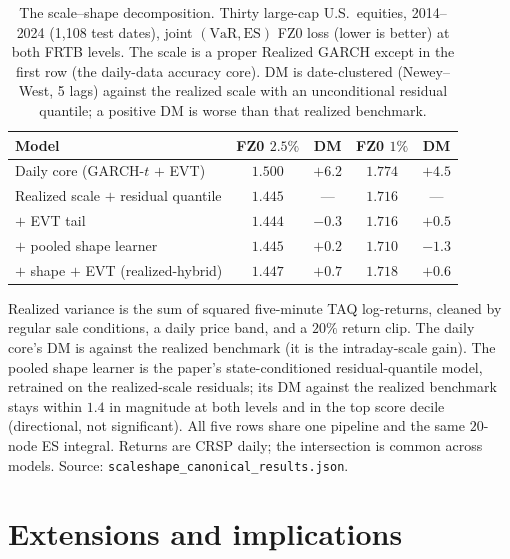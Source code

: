 \documentclass[11pt]{article}
\newcommand{\VaR}{\mathrm{VaR}}
\newcommand{\ES}{\mathrm{ES}}
\theoremstyle{remark}
\begin{document}
\begin{table}[t]
\centering
\begin{threeparttable}
\caption{The scale--shape decomposition. Thirty large-cap U.S.\ equities,
2014--2024 (1{,}108 test dates), joint $(\VaR,\ES)$ FZ0 loss (lower is better) at
both FRTB levels. The scale is a proper Realized GARCH except in the first row (the
daily-data accuracy core). DM is date-clustered (Newey--West, 5 lags) against the
realized scale with an unconditional residual quantile; a positive DM is worse than
that realized benchmark.}
\label{tab:rgarch}
\small\setlength{\tabcolsep}{6pt}
\begin{tabular}{lcccc}
\toprule
Model & FZ0 $2.5\%$ & DM & FZ0 $1\%$ & DM \\
\midrule
Daily core (GARCH-$t$ $+$ EVT) & $1.500$ & $+6.2$ & $1.774$ & $+4.5$ \\
Realized scale $+$ residual quantile & $1.445$ & --- & $1.716$ & --- \\
\quad $+$ EVT tail & $1.444$ & $-0.3$ & $1.716$ & $+0.5$ \\
\quad $+$ pooled shape learner & $1.445$ & $+0.2$ & $1.710$ & $-1.3$ \\
\quad $+$ shape $+$ EVT (realized-hybrid) & $1.447$ & $+0.7$ & $1.718$ & $+0.6$ \\
\bottomrule
\end{tabular}
\begin{tablenotes}\footnotesize
\item Realized variance is the sum of squared five-minute TAQ log-returns, cleaned
by regular sale conditions, a daily price band, and a $20\%$ return clip. The daily
core's DM is against the realized benchmark (it is the intraday-scale gain). The
pooled shape learner is the paper's state-conditioned residual-quantile model,
retrained on the realized-scale residuals; its DM against the realized benchmark
stays within $1.4$ in magnitude at both levels and in the top score decile
(directional, not significant). All five rows share one pipeline and the same
$20$-node ES integral. Returns are CRSP daily; the intersection is common across
models. Source: \texttt{scaleshape\_canonical\_results.json}.
\end{tablenotes}
\end{threeparttable}
\end{table}

\section{Extensions and implications}\label{sec:applications}
\end{document}
